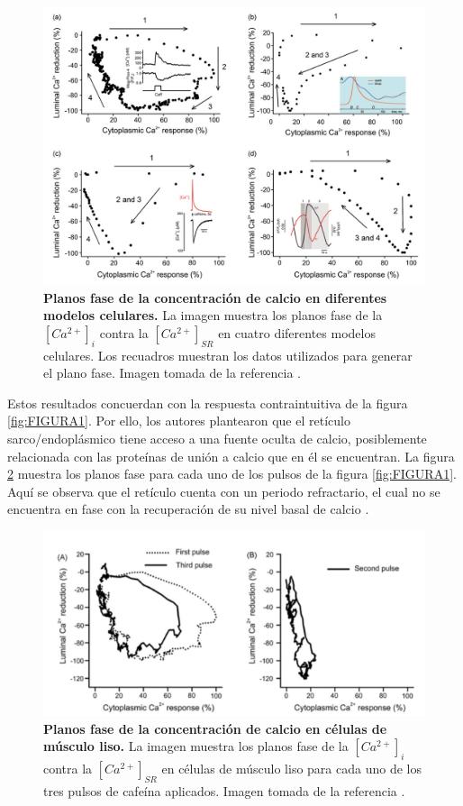 \documentclass[draft]{article}
\newcommand{\Cai}{[Ca^{2+}]_{i}}
\newcommand{\Cal}{[Ca^{2+}]_{SR}}
\begin{document}
\begin{figure}[h]
	\centering
	\includegraphics{FIGURA2}
	\caption{\textbf{Planos fase de la concentración de calcio en diferentes modelos celulares.} La imagen muestra los planos fase de la $\Cai$ contra la $\Cal$ en cuatro diferentes modelos celulares. Los recuadros muestran los datos utilizados para generar el plano fase. Imagen tomada de la referencia \cite{Guerrero-Hernandez2010}.}
	\label{fig:FIGURA2}
\end{figure}

Estos resultados concuerdan con la respuesta contraintuitiva de la figura \ref{fig:FIGURA1}. Por ello, los autores plantearon que el retículo sarco/endoplásmico tiene acceso a una fuente oculta de calcio, posiblemente relacionada con las proteínas de unión a calcio que en él se encuentran. La figura \ref{fig:FIGURA3} muestra los planos fase para cada uno de los pulsos de la figura \ref{fig:FIGURA1}. Aquí se observa que el retículo cuenta con un periodo refractario, el cual no se encuentra en fase con la recuperación de su nivel basal de calcio \cite{Guerrero-Hernandez2010}. \\

\begin{figure}[h]
	\centering
	\includegraphics{FIGURA3}
	\caption{\textbf{Planos fase de la concentración de calcio en células de músculo liso.} La imagen muestra los planos fase de la $\Cai$ contra la $\Cal$ en células de músculo liso para cada uno de los tres pulsos de cafeína aplicados. Imagen tomada de la referencia \cite{Guerrero-Hernandez2010}.}
	\label{fig:FIGURA3}
\end{figure}
\end{document}
